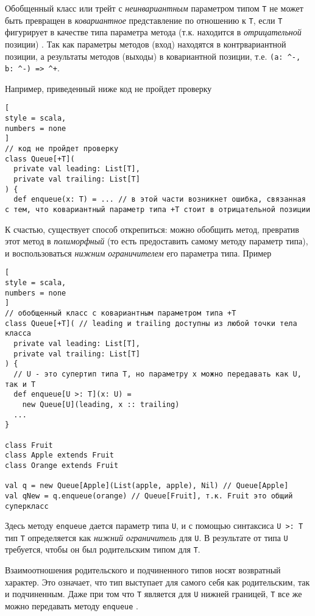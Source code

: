\documentclass[%
	11pt,
	a4paper,
	utf8,
		]{article}
\begin{document}
Обобщенный класс или трейт с \emph{неинвариантным} параметром типом \texttt{T} не может быть превращен в \emph{ковариантное} представление по отношению к \texttt{T}, если \texttt{T} фигурирует в качестве типа параметра метода (т.к. находится в \emph{отрицательной} позиции) \cite[]{odersky:scala-2020}. Так как параметры методов (вход) находятся в контрвариантной позиции, а результаты методов (выходы) в ковариантной позиции, т.е. \verb|(a: ^-, b: ^-) => ^+|.

Например, приведенный ниже код не пройдет проверку
\begin{lstlisting}[
style = scala,
numbers = none	
]
// код не пройдет проверку
class Queue[+T](
  private val leading: List[T],
  private val trailing: List[T]
) {
  def enqueue(x: T) = ... // в этой части возникнет ошибка, связанная с тем, что ковариантный параметр типа +T стоит в отрицательной позиции
\end{lstlisting}



К счастью, существует способ открепиться: можно обобщить метод, превратив этот метод в \emph{полиморфный} (то есть предоставить самому методу параметр типа), и воспользоваться \emph{нижним ограничителем} его параметра типа. Пример
\begin{lstlisting}[
style = scala,
numbers = none	
]
// обобщенный класс с ковариантным параметром типа +T
class Queue[+T]( // leading и trailing доступны из любой точки тела класса
  private val leading: List[T],
  private val trailing: List[T]
) {
  // U - это супертип типа T, но параметру x можно передавать как U, так и T
  def enqueue[U >: T](x: U) =
    new Queue[U](leading, x :: trailing)
  ...
}

class Fruit
class Apple extends Fruit
class Orange extends Fruit

val q = new Queue[Apple](List(apple, apple), Nil) // Queue[Apple]
val qNew = q.enqueue(orange) // Queue[Fruit], т.к. Fruit это общий суперкласс
\end{lstlisting}

Здесь методу \texttt{enqueue} дается параметр типа \texttt{U}, и с помощью синтаксиса \texttt{U >: T} тип \texttt{T} определяется как \emph{нижний ограничитель} для \texttt{U}. В результате от типа \texttt{U} требуется, чтобы он был родительским типом для \texttt{T}.

Взаимоотношения родительского и подчиненного типов носят возвратный характер. Это означает, что тип выступает для самого себя как родительским, так и подчиненным. Даже при том что \texttt{T} является для \texttt{U} нижней границей, \texttt{T} все же можно передавать методу \texttt{enqueue} \cite[]{odersky:scala-2020}.
\end{document}
